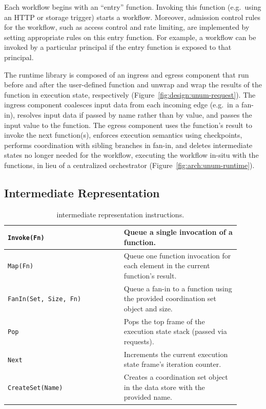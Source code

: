 Each \name{} workflow begins with an ``entry'' function. Invoking this
function (e.g.\ using an HTTP or storage trigger) starts a workflow. Moreover,
admission control rules for the workflow, such as access control and rate
limiting, are implemented by setting appropriate rules on this entry function.
For example, a workflow can be invoked by a particular principal if the entry
function is exposed to that principal.

The runtime library is composed of an ingress and egress component that run
before and after the user-defined function and unwrap and wrap the results of
the function in \name{} execution state, respectively
(Figure~\ref{fig:design:unum-request}). The ingress component coalesces input
data from each incoming edge (e.g.\ in a fan-in), resolves input data if passed
by name rather than by value, and passes the input value to the function. The
egress component uses the function's result to invoke the next function(s),
enforces execution semantics using checkpoints, performs coordination with
sibling branches in fan-in, and deletes intermediate states no longer needed for
the workflow, executing the workflow in-situ with the functions, in lieu of a
centralized orchestrator (Figure~\ref{fig:arch:unum-runtime}).



\subsection{\name{} Intermediate Representation}\label{sec:design:ir}

\begin{table}[t]
  \centering
  \begin{tabular}{|m{0.45\linewidth}|m{0.45\linewidth}|}
    \hline
  \texttt{Invoke(Fn)} & Queue a single invocation of a function.\\
    \hline
  \texttt{Map(Fn)} & Queue one function invocation for each element in the current function's result.\\
    \hline
  \texttt{FanIn(Set, Size, Fn)} & Queue a fan-in to a function using the provided coordination set object and size.\\
    \hline
  \texttt{Pop} & Pops the top frame of the execution state stack (passed via \name{} requests). \\
    \hline
  \texttt{Next} & Increments the current execution state frame's iteration counter.\\
    \hline
  \texttt{CreateSet(Name)} & Creates a coordination set object in the data store with the provided name.\\
    \hline
  \end{tabular}
  \caption{\name{} intermediate representation instructions.}
  \label{table:design:irschema}
\end{table}

